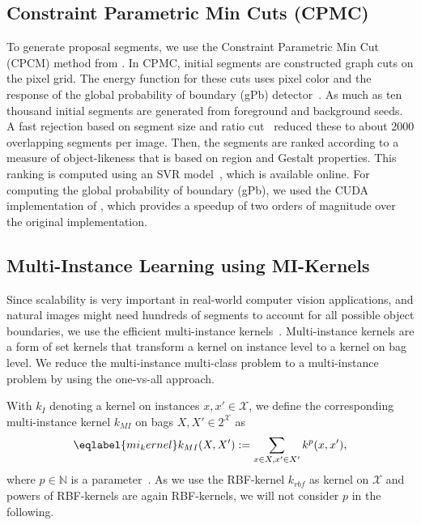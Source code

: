 \subsection{Constraint Parametric Min Cuts (CPMC)}
To generate proposal segments, we use the Constraint Parametric Min Cut (CPCM) method from \citet{carreira2010constrained}. In CPMC, initial
segments are constructed graph cuts on the pixel grid. The energy function for these cuts uses pixel
color and the response of the global probability of boundary (gPb) detector~\citep{maire2008using}. As much as ten thousand initial segments are generated from foreground
and background seeds. A fast rejection based on segment size and ratio cut~\citep{wang2003image} reduced these to about 2000 overlapping
segments per image. Then, the segments are ranked according to a measure of object-likeness that is based on region and Gestalt properties.
This ranking is computed using an SVR model~\citep{carreira2010constrained}, which is available online.
For computing the global probability of boundary (gPb), we used the CUDA implementation
of \citet{catanzaro2009efficient}, which provides a speedup of two orders of magnitude over the original implementation.

\subsection{Multi-Instance Learning using MI-Kernels}
Since scalability is very important in real-world computer vision
applications, and natural images might need hundreds of segments to
account for all possible object boundaries, we use the efficient
multi-instance kernels~\citep{gaertner2002multi}.
Multi-instance kernels are a form of set kernels that transform a kernel
on instance level to a kernel on bag level.
We reduce the multi-instance multi-class problem to a multi-instance problem by using the one-vs-all approach.

With $k_I$ denoting a kernel on instances $x,x' \in \mathcal{X}$, we define the corresponding multi-instance kernel $k_{MI}$ on bags $X,X' \in 2^\mathcal{X}$
as
\begin{equation}\eqlabel{mi_kernel}
k_{MI}(X,X') := \sum_{x \in X, x' \in X'} k^p(x,x'),
\end{equation}
where $p \in \mathbb{N}$ is a parameter~\citep{gaertner2002multi}. As we use the RBF-kernel $k_{rbf}$ as kernel on $\mathcal{X}$ and powers of RBF-kernels
are again RBF-kernels, we will not consider $p$ in the following.

